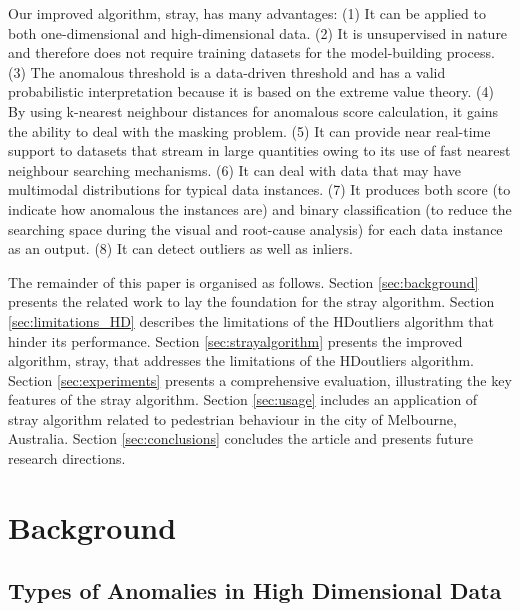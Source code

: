 \documentclass[11pt,a4paper,]{article}
\theoremstyle{definition}
\theoremstyle{definition}
\theoremstyle{definition}
\theoremstyle{remark}
\begin{document}
Our improved algorithm, stray, has many advantages: (1) It can
be applied to both one-dimensional and high-dimensional data. (2) It is unsupervised in nature and therefore does not require training datasets for the model-building process. (3) The anomalous threshold is a data-driven threshold and has a valid probabilistic interpretation because it is based on the extreme value theory. (4) By using k-nearest neighbour distances for anomalous score calculation, it gains the ability to deal with the masking problem. (5) It can provide near real-time support to datasets that stream in large quantities owing to its use of fast nearest neighbour searching mechanisms. (6) It can deal with data that may have multimodal distributions for typical data instances. (7) It produces both score (to indicate how anomalous the instances are) and binary classification (to reduce the searching space during the visual and root-cause analysis) for each data instance as an output. (8) It can detect outliers as well as inliers.

The remainder of this paper is organised as follows. Section \ref{sec:background} presents the related work to lay the foundation for the stray algorithm. Section \ref{sec:limitations_HD} describes the limitations of the HDoutliers algorithm that hinder its performance. Section \ref{sec:strayalgorithm} presents the improved algorithm, stray, that addresses the limitations of the HDoutliers algorithm.
Section \ref{sec:experiments} presents a comprehensive evaluation, illustrating the key features of the stray algorithm. Section \ref{sec:usage} includes an application of stray algorithm related to pedestrian behaviour in the city of Melbourne, Australia. Section \ref{sec:conclusions} concludes the article and presents future research directions.

\hypertarget{background}{%
\section{Background}\label{background}}

\label{sec:background}

\hypertarget{types-of-anomalies-in-high-dimensional-data}{%
\subsection{Types of Anomalies in High Dimensional Data}\label{types-of-anomalies-in-high-dimensional-data}}
\end{document}
